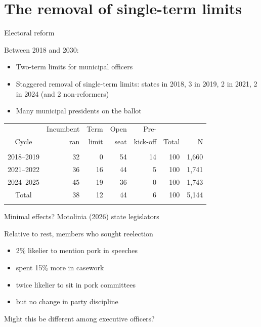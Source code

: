\documentclass[bigger]{beamer}
\begin{document}
\section{The removal of single-term limits}
\label{sec:org2bd40c1}
\begin{frame}[label={sec:orgbbc5f5e}]{Electoral reform}
\begin{block}{Between 2018 and 2030:}
\begin{itemize}
\item Two-term limits for municipal officers \pause
\item Staggered removal of single-term limits:  states in 2018, 3 in 2019, 2 in 2021, 2 in 2024 \newline (and 2 non-reformers) \pause
\item Many municipal presidents on the ballot
\end{itemize}
\centering \footnotesize
\bigskip

\begin{tabular}{crrrrrr}
             & Incumbent         & Term       & Open        & Pre-          &       &      \\ [-0.4ex]
  Cycle      &      ran          & limit      & seat        & kick-off      & Total &    N \\ [1ex] \hline \\ [-1.8ex]
  2018--2019 &                32 &          0 &          54 &            14 &   100 & 1,660 \\
  2021--2022 &                36 &         16 &          44 &             5 &   100 & 1,741 \\
  2024--2025 &                45 &         19 &          36 &             0 &   100 & 1,743 \\ [0.5ex] 
  Total      &                38 &         12 &          44 &             6 &   100 & 5,144 \\
  \\ [-2ex] \hline
\end{tabular}
\end{block}
\end{frame}
\begin{frame}[label={sec:orgbe25c0c}]{Minimal effects?}
Motolinia (2026) state legislators
\begin{block}{Relative to rest, members who sought reelection}
\begin{itemize}
\item 2\% likelier to mention pork in speeches
\item spent 15\% more in casework
\item twice likelier to sit in pork committees
\item but no change in party discipline \pause
\end{itemize}
\end{block}
\begin{block}{Might this be different among \alert{executive} officers?}
\end{block}
\end{frame}
\end{document}
